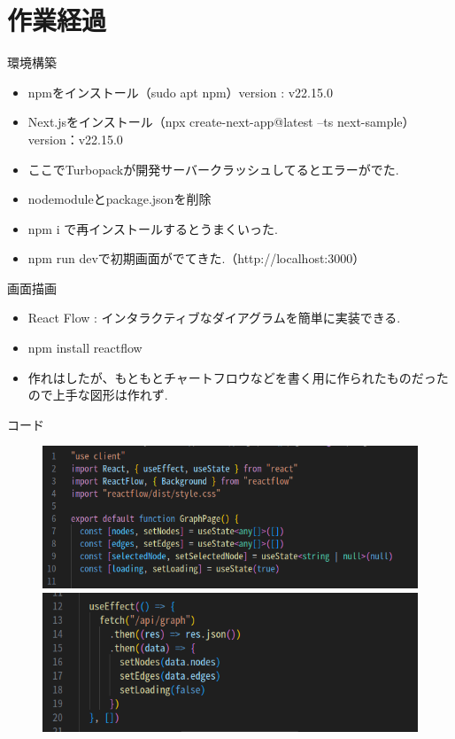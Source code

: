 \documentclass[aspectratio=169]{beamer}
\begin{document}
\section{作業経過}
\begin{frame}{環境構築}
    \begin{itemize}
        \setlength{\itemsep}{1em}
        \item npmをインストール（sudo apt npm）version : v22.15.0
        \item Next.jsをインストール（npx create-next-app@latest --ts next-sample）version：v22.15.0
        \item ここでTurbopackが開発サーバークラッシュしてるとエラーがでた.
        \item \rightarrow nodemoduleとpackage.jsonを削除
        \item npm i で再インストールするとうまくいった.
        \item npm run devで初期画面がでてきた.（http://localhost:3000）
    \end{itemize}    
\end{frame}

\begin{frame}{画面描画}
    \begin{itemize}
        \setlength{\itemsep}{2em}
        \item React Flow : インタラクティブなダイアグラムを簡単に実装できる.
        \item npm install reactflow
        \item 作れはしたが、もともとチャートフロウなどを書く用に作られたものだったので上手な図形は作れず.
    \end{itemize}
\end{frame}

\begin{frame}[allowframebreaks]{コード}
    \begin{figure}
        \includegraphics[scale=0.6]{graph1.png}
        \includegraphics[scale=0.6]{graph2.png}
    \end{figure}
\end{frame}
\end{document}
